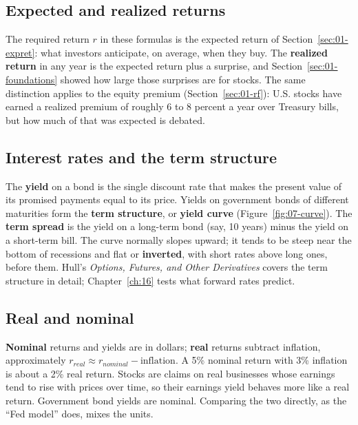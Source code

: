 \subsection{Expected and realized returns}

The required return $r$ in these formulas is the expected return of Section~\ref{sec:01-expret}: what investors anticipate, on average, when they buy. The \textbf{realized return} in any year is the expected return plus a surprise, and Section~\ref{sec:01-foundations} showed how large those surprises are for stocks. The same distinction applies to the equity premium (Section~\ref{sec:01-rf}): U.S. stocks have earned a realized premium of roughly 6 to 8 percent a year over Treasury bills, but how much of that was expected is debated.

\subsection{Interest rates and the term structure}
\label{sec:07-rates}

The \textbf{yield} on a bond is the single discount rate that makes the present value of its promised payments equal to its price. Yields on government bonds of different maturities form the \textbf{term structure}, or \textbf{yield curve} (Figure~\ref{fig:07-curve}). The \textbf{term spread} is the yield on a long-term bond (say, 10 years) minus the yield on a short-term bill. The curve normally slopes upward; it tends to be steep near the bottom of recessions and flat or \textbf{inverted}, with short rates above long ones, before them. Hull's \emph{Options, Futures, and Other Derivatives} covers the term structure in detail; Chapter~\ref{ch:16} tests what forward rates predict.


\subsection{Real and nominal}

\textbf{Nominal} returns and yields are in dollars; \textbf{real} returns subtract inflation, approximately $r_{real} \approx r_{nominal} - \text{inflation}$. A 5\% nominal return with 3\% inflation is about a 2\% real return. Stocks are claims on real businesses whose earnings tend to rise with prices over time, so their earnings yield behaves more like a real return. Government bond yields are nominal. Comparing the two directly, as the ``Fed model'' does, mixes the units.

